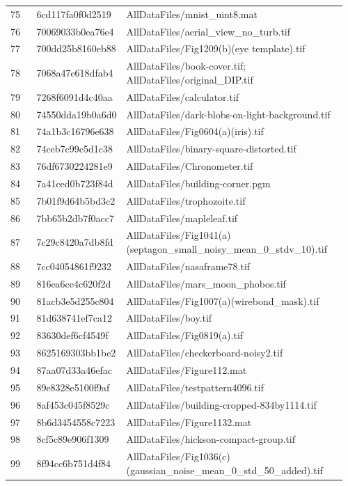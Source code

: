 \documentclass[11pt]{article}
\begin{document}
\begin{longtable}{p{0.08\linewidth}p{0.22\linewidth}p{0.66\linewidth}}
75 & 6cd117fa0f0d2519 & AllDataFiles/mnist\_uint8.mat \\
76 & 70069033b0ea76e4 & AllDataFiles/aerial\_view\_no\_turb.tif \\
77 & 700dd25b8160eb88 & AllDataFiles/Fig1209(b)(eye template).tif \\
78 & 7068a47e618dfab4 & AllDataFiles/book-cover.tif; AllDataFiles/original\_DIP.tif \\
79 & 7268f6091d4c40aa & AllDataFiles/calculator.tif \\
80 & 74550dda19b0a6d0 & AllDataFiles/dark-blobs-on-light-background.tif \\
81 & 74a1b3c16796e638 & AllDataFiles/Fig0604(a)(iris).tif \\
82 & 74ceb7c99c5d1c38 & AllDataFiles/binary-square-distorted.tif \\
83 & 76df6730224281e9 & AllDataFiles/Chronometer.tif \\
84 & 7a41ced0b723f84d & AllDataFiles/building-corner.pgm \\
85 & 7b01f9d64b5bd3c2 & AllDataFiles/trophozoite.tif \\
86 & 7bb65b2db7f0acc7 & AllDataFiles/mapleleaf.tif \\
87 & 7c29c8420a7db8fd & AllDataFiles/Fig1041(a)(septagon\_small\_noisy\_mean\_0\_stdv\_10).tif \\
88 & 7cc04054861f9232 & AllDataFiles/nasaframe78.tif \\
89 & 816ea6ce4c620f2d & AllDataFiles/mars\_moon\_phobos.tif \\
90 & 81acb3e5d255c804 & AllDataFiles/Fig1007(a)(wirebond\_mask).tif \\
91 & 81d638741ef7ca12 & AllDataFiles/boy.tif \\
92 & 83630def6cf4549f & AllDataFiles/Fig0819(a).tif \\
93 & 8625169303bb1be2 & AllDataFiles/checkerboard-noisy2.tif \\
94 & 87aa07d33a46efac & AllDataFiles/Figure112.mat \\
95 & 89e8328e5100f9af & AllDataFiles/testpattern4096.tif \\
96 & 8af453c045f8529c & AllDataFiles/building-cropped-834by1114.tif \\
97 & 8b6d3454558c7223 & AllDataFiles/Figure1132.mat \\
98 & 8cf5c89e906f1309 & AllDataFiles/hickson-compact-group.tif \\
99 & 8f94cc6b751d4f84 & AllDataFiles/Fig1036(c)(gaussian\_noise\_mean\_0\_std\_50\_added).tif \\

\end{longtable}
\end{document}
